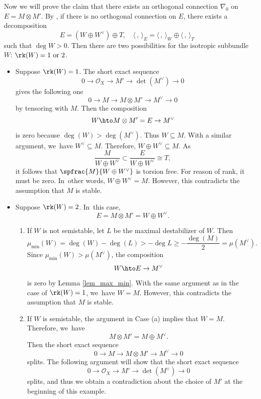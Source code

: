 \begin{examp}
Now we will prove the claim that there exists an orthogonal connection $\nabla_0$ on $E = M \otimes M'$. By \cite[Th.\,4.2]{BMW11}, if there is no orthogonal connection on $E$, there exists a decomposition
\[
E= (W \oplus W^{\vee}) \oplus T, \quad \langle \,, \, \rangle_E = \langle \,, \, \rangle_W \oplus \langle \,, \, \rangle_T
\]
such that $\deg W > 0$. Then there are two possibilities for the isotropic subbundle $W$: $\rk(W)=1 \text{ or } 2$.
\begin{itemize}
\item Suppose $\rk(W)=1$. The short exact sequence
\[
0 \to \mathcal{O}_X \to M' \to \det(M^{\vee}) \to 0
\]
gives the following one
\[
0 \to M \to M \otimes M' \to M^{\vee} \to 0
\]
by tensoring with $M$. Then the composition
\[
W \hto M \otimes M' = E \to M^{\vee}
\]
is zero because $\deg(W) > \deg(M^{\vee})$. Thus $W \subseteq M$. With a similar argument, we~have $W^{\vee} \subseteq M$. Therefore, $W \oplus W^{\vee} \subseteq M$. As
\[
\frac{M}{W\oplus W^{\vee}} \subset \frac{E}{W\oplus W^{\vee}}\cong T,
\]
it follows that $ \spfrac{M}{W\oplus W^{\vee}}$ is torsion free. For reason of rank, it must be zero. In~other words, $W \oplus W^{\vee} = M$. However, this contradicts the assumption that $M$ is stable.

\item Suppose $\rk(W)=2$. In~this case,
\[
E = M \otimes M' = W \oplus W^\vee.
\]

\begin{enumerate}
\item[(a)] If $W$ is not semistable, let $L$ be the maximal destabilizer of $W$. Then
\[
\mu_{\min}(W) = \deg(W) - \deg(L) > - \deg L \geq - \frac{\deg(M)}{2} = \mu(M^{\vee}).
\]
Since $\mu_{\min}(W) > \mu(M^{\vee})$, the composition
\[
W \hto E \to M^{\vee}
\]
is zero by Lemma \ref{lem_max_min}. With the same argument as in the case of $\rk(W)=1$, we~have $W=M$. However, this contradicts the assumption that $M$ is stable.

\item[(b)] If $W$ is semistable, the argument in Case (a) implies that $W=M$. Therefore, we~have
\[
M \otimes M' = M \oplus M^{\vee}.
\]
Then the short exact sequence
\[
0 \to M \to M \otimes M' \to M^{\vee} \to 0
\]
splits. The following argument will show that the short exact sequence
\[
0 \to \mathcal{O}_X \to M' \to \det(M^{\vee}) \to 0
\]
splits, and thus we obtain a contradiction about the choice of $M'$ at the beginning of this example.


\end{enumerate}
\end{itemize}
\end{examp}
